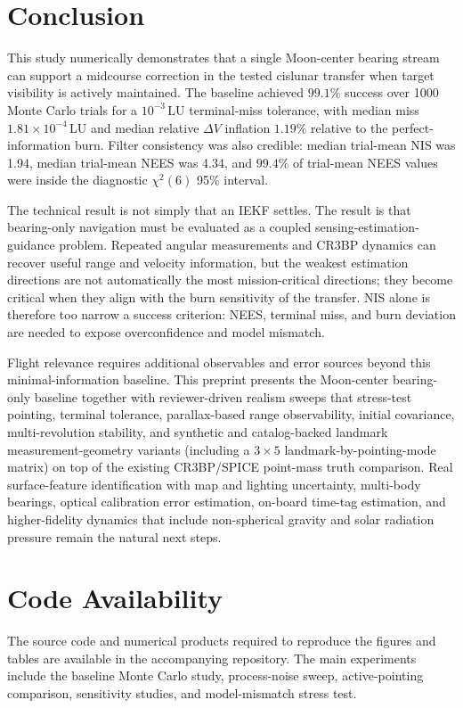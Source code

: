 \documentclass[10pt,twocolumn]{article}
\newcommand{\LU}{\mathrm{LU}}
\newcommand{\chisq}{\chi^2}
\begin{document}
\section{Conclusion}
This study numerically demonstrates that a single Moon-center bearing stream can support a midcourse correction in the tested cislunar transfer when target visibility is actively maintained.  The baseline achieved $99.1\%$ success over 1000 Monte Carlo trials for a $10^{-3}\,\LU$ terminal-miss tolerance, with median miss $1.81\times10^{-4}\,\LU$ and median relative $\Delta V$ inflation $1.19\%$ relative to the perfect-information burn.  Filter consistency was also credible: median trial-mean NIS was 1.94, median trial-mean NEES was 4.34, and $99.4\%$ of trial-mean NEES values were inside the diagnostic $\chisq(6)$ 95\% interval.

The technical result is not simply that an IEKF settles.  The result is that bearing-only navigation must be evaluated as a coupled sensing-estimation-guidance problem.  Repeated angular measurements and CR3BP dynamics can recover useful range and velocity information, but the weakest estimation directions are not automatically the most mission-critical directions; they become critical when they align with the burn sensitivity of the transfer.  NIS alone is therefore too narrow a success criterion: NEES, terminal miss, and burn deviation are needed to expose overconfidence and model mismatch.

Flight relevance requires additional observables and error sources beyond this minimal-information baseline.  This preprint presents the Moon-center bearing-only baseline together with reviewer-driven realism sweeps that stress-test pointing, terminal tolerance, parallax-based range observability, initial covariance, multi-revolution stability, and synthetic and catalog-backed landmark measurement-geometry variants (including a $3\times 5$ landmark-by-pointing-mode matrix) on top of the existing CR3BP/SPICE point-mass truth comparison.  Real surface-feature identification with map and lighting uncertainty, multi-body bearings, optical calibration error estimation, on-board time-tag estimation, and higher-fidelity dynamics that include non-spherical gravity and solar radiation pressure remain the natural next steps.

\section*{Code Availability}
The source code and numerical products required to reproduce the figures and tables are available in the accompanying repository.  The main experiments include the baseline Monte Carlo study, process-noise sweep, active-pointing comparison, sensitivity studies, and model-mismatch stress test.
\end{document}
